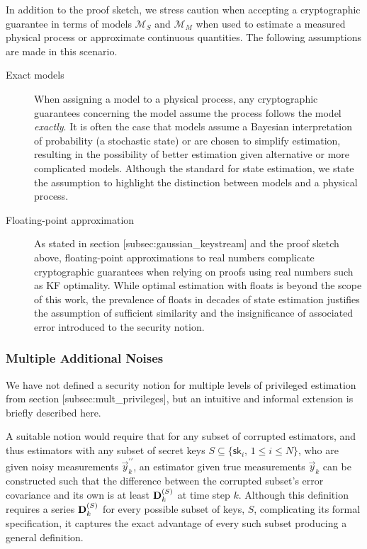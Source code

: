 
In addition to the proof sketch, we stress caution when accepting a cryptographic guarantee in terms of models $\mathcal{M}_S$ and $\mathcal{M}_M$ when used to estimate a measured physical process or approximate continuous quantities. The following assumptions are made in this scenario.
\begin{description}
   \item[Exact models] When assigning a model to a physical process, any cryptographic guarantees concerning the model assume the process follows the model \textit{exactly}. It is often the case that models assume a Bayesian interpretation of probability (a stochastic state) or are chosen to simplify estimation, resulting in the possibility of better estimation given alternative or more complicated models. Although the standard for state estimation, we state the assumption to highlight the distinction between models and a physical process.
   \item[Floating-point approximation] As stated in section [subsec:gaussian\_keystream] and the proof sketch above, floating-point approximations to real numbers complicate cryptographic guarantees when relying on proofs using real numbers such as KF optimality. While optimal estimation with floats is beyond the scope of this work, the prevalence of floats in decades of state estimation justifies the assumption of sufficient similarity and the insignificance of associated error introduced to the security notion.
\end{description}

% 
% 

\subsubsection{Multiple Additional Noises}
We have not defined a security notion for multiple levels of privileged estimation from section [subsec:mult\_privileges], but an intuitive and informal extension is briefly described here. 

A suitable notion would require that for any subset of corrupted estimators, and thus estimators with any subset of secret keys $S \subseteq \{\mathsf{sk}_i,\,1\leq i\leq N\}$, who are given noisy measurements $\vec{y}_k^{\prime\prime}$, an estimator given true measurements $\vec{y}_k$ can be constructed such that the difference between the corrupted subset's error covariance and its own is at least ${{\mathbf{D}}}^{(S)}_k$ at time step $k$. Although this definition requires a series ${{\mathbf{D}}}^{(S)}_k$ for every possible subset of keys, $S$, complicating its formal specification, it captures the exact advantage of every such subset producing a general definition.

